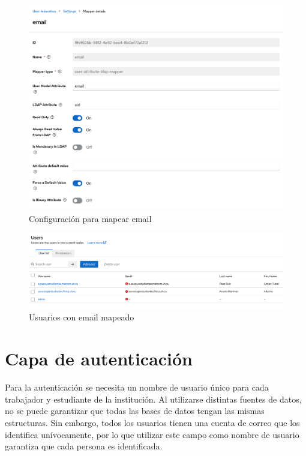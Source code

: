 \begin{enumerate}
	\begin{figure}[H]
		\centering
		\includegraphics[width=1\linewidth]{Graphics/mapper_config}
		\caption{Configuración para mapear email}
		\label{fig:mapperconfig}
	\end{figure}
	
	
	\begin{figure}[H]
		\centering
		\includegraphics[width=1\linewidth]{Graphics/users_with_email}
		\caption{Usuarios con email mapeado}
		\label{fig:userswithemail}
	\end{figure}
	

\end{enumerate}


\section{Capa de autenticación} \label{auth-flow}


Para la autenticación se necesita un nombre de usuario único para cada trabajador y estudiante de la institución. Al utilizarse distintas fuentes de datos, no se puede garantizar que todas las bases de datos tengan las mismas estructuras. Sin embargo, todos los usuarios tienen una cuenta de correo que los identifica unívocamente, por lo que utilizar este campo como nombre de usuario garantiza que cada persona es identificada.

